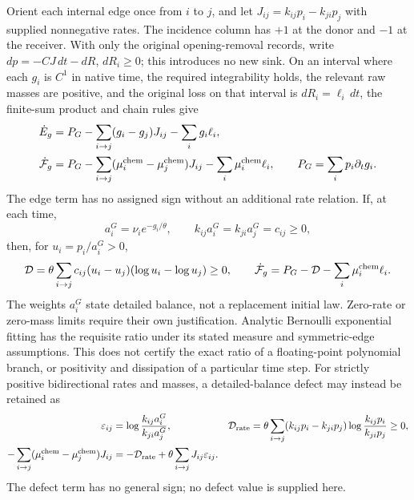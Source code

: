 \documentclass[11pt]{article}
\begin{document}
Orient each internal edge once from $i$ to $j$, and let
$J_{ij}=k_{ij}p_i-k_{ji}p_j$ with supplied nonnegative rates. The incidence
column has $+1$ at the donor and $-1$ at the receiver. With only the original
opening-removal records, write $dp=-C J\,dt-dR$, $dR_i\geq0$; this introduces
no new sink. On an interval where each $g_i$ is $C^1$ in native time, the required
integrability holds, the relevant raw masses are positive, and the original
loss on that interval is $dR_i=\ell_i\,dt$, the finite-sum product and chain
rules give
\begin{align}
 \dot E_g&=P_G-\sum_{i\to j}(g_i-g_j)J_{ij}-\sum_i g_i\ell_i,\nonumber\\
 \dot{\mathcal F}_g
 &=P_G-\sum_{i\to j}(\mu_i^{\rm chem}-\mu_j^{\rm chem})J_{ij}
       -\sum_i\mu_i^{\rm chem}\ell_i,\qquad
 P_G=\sum_i p_i\partial_tg_i .
 \label{eq:r09-ac-energy}
\end{align}
The edge term has no assigned sign without an additional rate relation.
If, at each time,
\begin{equation}
 a_i^G=\nu_i e^{-g_i/\theta},\qquad
 k_{ij}a_i^G=k_{ji}a_j^G=c_{ij}\geq0,
 \label{eq:r09-db}
\end{equation}
then, for $u_i=p_i/a_i^G>0$,
\begin{equation}
 \mathcal D=\theta\sum_{i\to j}c_{ij}(u_i-u_j)(\log u_i-\log u_j)\geq0,
 \qquad \dot{\mathcal F}_g=P_G-\mathcal D-\sum_i\mu_i^{\rm chem}\ell_i.
 \label{eq:r09-db-dissipation}
\end{equation}
The weights $a_i^G$ state detailed balance, not a replacement initial law.
Zero-rate or zero-mass limits require their own justification.
Analytic Bernoulli exponential fitting has the requisite ratio under its
stated measure and symmetric-edge assumptions. This does not certify the
exact ratio of a floating-point polynomial branch, or positivity and
dissipation of a particular time step. For strictly positive bidirectional
rates and masses, a detailed-balance defect may instead be retained as
\begin{align}
 \varepsilon_{ij}&=\log\frac{k_{ij}a_i^G}{k_{ji}a_j^G},&
 \mathcal D_{\rm rate}&=\theta\sum_{i\to j}
  (k_{ij}p_i-k_{ji}p_j)\log\frac{k_{ij}p_i}{k_{ji}p_j}\geq0,\nonumber\\
 -\sum_{i\to j}(\mu_i^{\rm chem}-\mu_j^{\rm chem})J_{ij}
 &=-\mathcal D_{\rm rate}+\theta\sum_{i\to j}J_{ij}\varepsilon_{ij}.
 \label{eq:r09-db-defect}
\end{align}
The defect term has no general sign; no defect value is supplied here.
\end{document}
